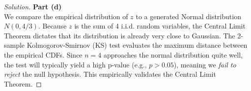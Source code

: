 \documentclass{article}
\begin{document}
\begin{proof}[Solution]
	\textbf{Part (d)}\\
	We compare the empirical distribution of $z$ to a generated Normal distribution $N(0, 4/3)$. Because $z$ is the sum of 4 i.i.d. random variables, the Central Limit Theorem dictates that its distribution is already very close to Gaussian. The 2-sample Kolmogorov-Smirnov (KS) test evaluates the maximum distance between the empirical CDFs. Since $n=4$ approaches the normal distribution quite well, the test will typically yield a high p-value (e.g., $p > 0.05$), meaning we \textit{fail to reject} the null hypothesis. This empirically validates the Central Limit Theorem.
\end{proof}
\end{document}
